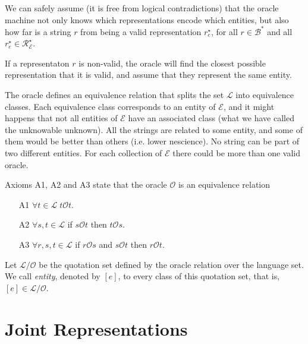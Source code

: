 {\color{red}

We can safely assume (it is free from logical contradictions) that the oracle machine not only knows which representations encode which entities, but also how far is a string $r$ from being a valid representation $r^\star_e$, for all $r \in \mathcal{B}^\ast$ and all $r^\star_e \in \mathcal{R}^\star_\mathcal{E}$. 

If a representaton $r$ is non-valid, the oracle will find the closest possible representation that it is valid, and assume that they represent the same entity.

The oracle defines an equivalence relation that splits the set $\mathcal{L}$ into equivalence classes. Each equivalence class corresponds to an entity of $\mathcal{E}$, and it might happens that not all entities of $\mathcal{E}$ have an associated class (what we have called the unknowable unknown). All the strings are related to some entity, and some of them would be better than others (i.e. lower nescience). No string can be part of two different entities. For each collection of $\mathcal{E}$ there could be more than one valid oracle.

\begin{proposition}
Axioms A1, A2 and A3 state that the oracle $\mathcal{O}$ is an equivalence relation
\begin{itemize}
\item[A1] $\forall t \in \mathcal{L} \; t \mathcal{O} t$.
\item[A2] $\forall s , t \in \mathcal{L}$ if $s \mathcal{O} t$ then $t \mathcal{O} s$.
\item[A3] $\forall r, s , t \in \mathcal{L}$ if $r \mathcal{O} s$ and $s \mathcal{O} t$ then $r \mathcal{O} t$.
\end{itemize}
\end{proposition}

\begin{definition}
Let $\mathcal{L} / \mathcal{O}$ be the quotation set defined by the oracle relation over the language set. We call \emph{entity}, denoted by $[e]$, to every class of this quotation set, that is, $[e] \in \mathcal{L} / \mathcal{O}$.
\end{definition}

}

%
%

\section{Joint Representations}
\label{sec:descriptions_joint_topic}

